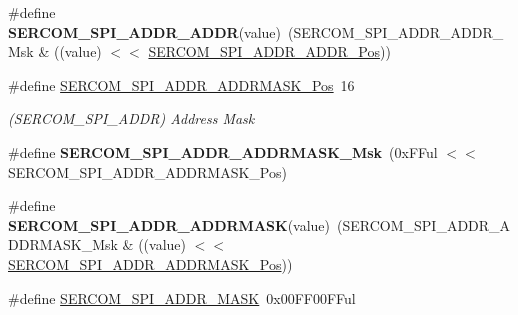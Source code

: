\begin{DoxyCompactItemize}
\item 
\hypertarget{group___s_a_m_l21___s_e_r_c_o_m_ga5ae8ab06c2d67189cdddd5e66b6698e6}{}\#define {\bfseries S\+E\+R\+C\+O\+M\+\_\+\+S\+P\+I\+\_\+\+A\+D\+D\+R\+\_\+\+A\+D\+D\+R}(value)~(S\+E\+R\+C\+O\+M\+\_\+\+S\+P\+I\+\_\+\+A\+D\+D\+R\+\_\+\+A\+D\+D\+R\+\_\+\+Msk \& ((value) $<$$<$ \hyperlink{group___s_a_m_l21___s_e_r_c_o_m_ga97f1119d4ede94d57a763a3118a8bbd0}{S\+E\+R\+C\+O\+M\+\_\+\+S\+P\+I\+\_\+\+A\+D\+D\+R\+\_\+\+A\+D\+D\+R\+\_\+\+Pos}))\label{group___s_a_m_l21___s_e_r_c_o_m_ga5ae8ab06c2d67189cdddd5e66b6698e6}

\item 
\hypertarget{group___s_a_m_l21___s_e_r_c_o_m_ga6d47ea34d101ac15d965c5679ab4ecae}{}\#define \hyperlink{group___s_a_m_l21___s_e_r_c_o_m_ga6d47ea34d101ac15d965c5679ab4ecae}{S\+E\+R\+C\+O\+M\+\_\+\+S\+P\+I\+\_\+\+A\+D\+D\+R\+\_\+\+A\+D\+D\+R\+M\+A\+S\+K\+\_\+\+Pos}~16\label{group___s_a_m_l21___s_e_r_c_o_m_ga6d47ea34d101ac15d965c5679ab4ecae}

\begin{DoxyCompactList}\small\item\em (S\+E\+R\+C\+O\+M\+\_\+\+S\+P\+I\+\_\+\+A\+D\+D\+R) Address Mask \end{DoxyCompactList}\item 
\hypertarget{group___s_a_m_l21___s_e_r_c_o_m_ga10f6da95272e26b136520f78bc1fca5c}{}\#define {\bfseries S\+E\+R\+C\+O\+M\+\_\+\+S\+P\+I\+\_\+\+A\+D\+D\+R\+\_\+\+A\+D\+D\+R\+M\+A\+S\+K\+\_\+\+Msk}~(0x\+F\+Ful $<$$<$ S\+E\+R\+C\+O\+M\+\_\+\+S\+P\+I\+\_\+\+A\+D\+D\+R\+\_\+\+A\+D\+D\+R\+M\+A\+S\+K\+\_\+\+Pos)\label{group___s_a_m_l21___s_e_r_c_o_m_ga10f6da95272e26b136520f78bc1fca5c}

\item 
\hypertarget{group___s_a_m_l21___s_e_r_c_o_m_ga3c5cab84d43e28e76f3d453d2d9820f9}{}\#define {\bfseries S\+E\+R\+C\+O\+M\+\_\+\+S\+P\+I\+\_\+\+A\+D\+D\+R\+\_\+\+A\+D\+D\+R\+M\+A\+S\+K}(value)~(S\+E\+R\+C\+O\+M\+\_\+\+S\+P\+I\+\_\+\+A\+D\+D\+R\+\_\+\+A\+D\+D\+R\+M\+A\+S\+K\+\_\+\+Msk \& ((value) $<$$<$ \hyperlink{group___s_a_m_l21___s_e_r_c_o_m_ga6d47ea34d101ac15d965c5679ab4ecae}{S\+E\+R\+C\+O\+M\+\_\+\+S\+P\+I\+\_\+\+A\+D\+D\+R\+\_\+\+A\+D\+D\+R\+M\+A\+S\+K\+\_\+\+Pos}))\label{group___s_a_m_l21___s_e_r_c_o_m_ga3c5cab84d43e28e76f3d453d2d9820f9}

\item 
\hypertarget{group___s_a_m_l21___s_e_r_c_o_m_ga6e6df2565708defc68aa9d7336bdd5c2}{}\#define \hyperlink{group___s_a_m_l21___s_e_r_c_o_m_ga6e6df2565708defc68aa9d7336bdd5c2}{S\+E\+R\+C\+O\+M\+\_\+\+S\+P\+I\+\_\+\+A\+D\+D\+R\+\_\+\+M\+A\+S\+K}~0x00\+F\+F00\+F\+Ful\label{group___s_a_m_l21___s_e_r_c_o_m_ga6e6df2565708defc68aa9d7336bdd5c2}


\end{DoxyCompactItemize}

